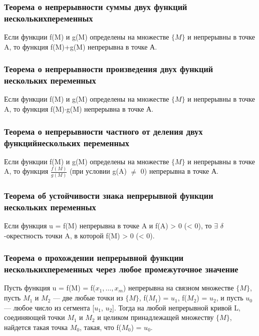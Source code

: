\documentclass[a4paper, 12pt]{article}
\def\newline{}%
\begin{document}
            \subsubsection{Теорема о непрерывности суммы двух функций нескольких\newline переменных}

            Если функции f(M) и g(M) определены на множестве $\{M\}$ и непрерывны в точке A, то
            функция f(M)+g(M) непрерывна в точке А.

            \subsubsection{Теорема о непрерывности произведения двух функций нескольких переменных}

            Если функции f(M) и g(M) определены на множестве $\{M\}$ и непрерывны в точке A, то
            функция f(M)$\cdot$g(M) непрерывна в точке А.

            \subsubsection{Теорема о непрерывности частного от деления двух функций\newline нескольких переменных}

            Если функции f(M) и g(M) определены на множестве $\{M\}$ и непрерывны в точке A, то
            функция $\frac{f(M)}{g(M)}$ (при условии g(A) $\neq$ 0) непрерывна в точке А.

            \subsubsection{Теорема об устойчивости знака непрерывной функции нескольких переменных}

            Если функция u = f(M) непрерывна в точке A и f(A) > 0 (< 0), то $\exists$ $\delta$-окрестность
            точки A, в которой f(M) > 0 (< 0).

            \subsubsection{Теорема о прохождении непрерывной функции нескольких\newline переменных через любое промежуточное значение}

            Пусть функция u = f(M) = f($x_1, \ldots, x_m$) непрерывна на связном множестве $\{M\}$, пусть
            $M_1$ и $M_2$ — две любые точки из $\{M\}$, f($M_1$) = $u_1$, f($M_2$) = $u_2$,
            и пусть $u_0$ — любое число из сегмента [$u_1$, $u_2$].
            Тогда на любой непрерывной кривой L, соединяющей точки
            $M_1$ и $M_2$ и целиком принадлежащей множеству $\{M\}$, найдется
            такая точка $M_0$, такая, что f($M_0$) = $u_0$.
\end{document}
